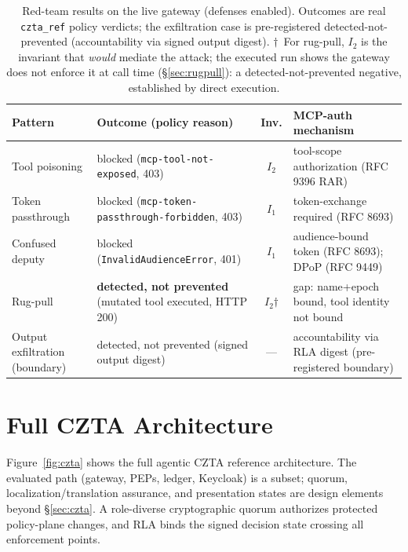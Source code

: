 \documentclass[conference]{IEEEtran}
\newcommand{\Ione}{\ensuremath{I_1}}
\newcommand{\Itwo}{\ensuremath{I_2}}
\begin{document}
\begin{table}[t]
\centering
\caption{Red-team results on the live gateway (defenses enabled).
Outcomes are real \texttt{czta\_ref} policy verdicts; the
exfiltration case is pre-registered detected-not-prevented
(accountability via signed output digest). $\dagger$~For rug-pull,
\Itwo{} is the invariant that \emph{would} mediate the attack; the
executed run shows the gateway does not enforce it at call time
(\S\ref{sec:rugpull}): a detected-not-prevented negative,
established by direct execution.}
\label{tab:redteam}
\scriptsize
\setlength{\tabcolsep}{3.2pt}
\begin{tabularx}{\columnwidth}{@{}>{\raggedright\arraybackslash}p{1.55cm} >{\raggedright\arraybackslash}p{2.75cm} c >{\raggedright\arraybackslash}X@{}}
\toprule
Pattern & Outcome (policy reason) & Inv. & MCP-auth mechanism \\
\midrule
Tool poisoning & blocked (\texttt{mcp-tool-not-exposed}, 403) & \Itwo & tool-scope authorization (RFC 9396 RAR) \\
Token passthrough & blocked (\texttt{mcp-token-}\allowbreak\texttt{passthrough-}\allowbreak\texttt{forbidden}, 403) & \Ione & token-exchange required (RFC 8693) \\
Confused deputy & blocked (\texttt{InvalidAudienceError}, 401) & \Ione & audience-bound token (RFC 8693); DPoP (RFC 9449) \\
Rug-pull & \textbf{detected, not prevented} (mutated tool executed, HTTP 200) & \Itwo$\dagger$ & gap: name+epoch bound, tool identity not bound \\
Output exfiltration (boundary) & detected, not prevented (signed output digest) & --- & accountability via RLA digest (pre-registered boundary) \\
\bottomrule
\end{tabularx}
\end{table}

\section{Full CZTA Architecture}
\label{app:arch}
Figure~\ref{fig:czta} shows the full agentic CZTA reference architecture.
The evaluated path (gateway, PEPs, ledger, Keycloak) is a subset; quorum,
localization/translation assurance, and presentation states are design
elements beyond \S\ref{sec:czta}. A role-diverse cryptographic quorum
authorizes protected policy-plane changes, and RLA binds the signed
decision state crossing all enforcement points.
\end{document}
